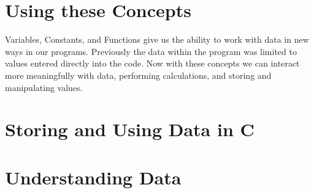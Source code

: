 \clearpage
\section{Using these Concepts} %
\label{sec:using_these_concepts_storing_using_data}

Variables, Constants, and Functions give us the ability to work with data in new ways in our programs. Previously the data within the program was limited to values entered directly into the code. Now with these concepts we can interact more meaningfully with data, performing calculations, and storing and manipulating values.







\clearpage
\def\pageLang{c}
\section{Storing and Using Data in C} %
\label{sec:storing_and_using_data_in_c}





% 













\clearpage
\def\pageLang{none}
\section{Understanding Data} %
\label{sec:understanding_dat}


